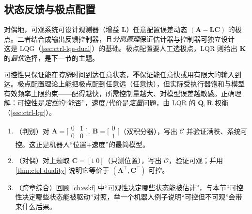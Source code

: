 \subsection{状态反馈与极点配置}
\label{sec:ctrl-pole-placement}

 对偶地，可观系统可设计观测器（增益 $\mathbf{L}$）任意配置误差动态 $(\mathbf{A}-\mathbf{L}\mathbf{C})$ 的极点。二者结合成输出反馈控制器，且\emph{分离原理}保证估计器与控制器可独立设计——这是 LQG（\cref{sec:ctrl-lqe-dual}）的基础。极点配置要人工选极点，LQR 则给出 $\mathbf{K}$ 的\emph{最优}选择，是下一节的主题。

\begin{pitfall}
可控性只保证能在\emph{有限}时间到达任意状态，\textbf{不}保证能任意快或用有限大的输入到达。极点配置理论上能把极点配到任意远（任意快），但实际受执行器饱和与模型有效频率上限约束——配得越快，所需控制量越大、对模型误差越敏感。正确理解：可控性是\emph{定性}的“能否”，速度/代价是\emph{定量}问题，由 LQR 的 $\mathbf{Q},\mathbf{R}$ 权衡（\cref{sec:ctrl-lqr}）。
\end{pitfall}

\begin{practice}
\begin{enumerate}
  \item （判别）对 $\mathbf{A}=\big[\begin{smallmatrix}0&1\\0&0\end{smallmatrix}\big],\ \mathbf{B}=\big[\begin{smallmatrix}0\\1\end{smallmatrix}\big]$（双积分器），写出 $\mathcal{C}$ 并验证满秩、系统可控。这正是机器人“位置+速度”的最简模型。
  \item （对偶）对上题取 $\mathbf{C}=[1\ 0]$（只测位置），写出 $\mathcal{O}$，验证可观；并用 \cref{thm:ctrl-duality} 说明它等价于 $(\mathbf{A}^\top,\mathbf{C}^\top)$ 可控。
  \item （跨章综合）回顾 \cref{ch:eskf} 中“可观性决定哪些状态能被估计”，与本节“可控性决定哪些状态能被驱动”对照，举一个机器人例子说明“可控但不可观”会带来什么后果。
\end{enumerate}
\end{practice}

